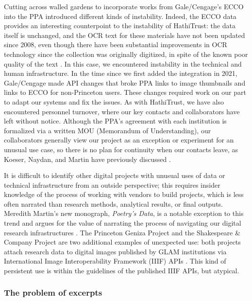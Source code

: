 \documentclass{anthology-ch}         %
\begin{document}
Cutting across walled gardens to incorporate works from Gale/Cengage’s ECCO into the PPA introduced different kinds of instability. Indeed, the ECCO data provides an interesting counterpoint to the instability of HathiTrust: the data itself is unchanged, and the OCR text for these materials have not been updated since 2008, even though there have been substantial improvements in OCR technology since the collection was originally digitized, in spite of the known poor quality of the text \cite{hill_quantifying_2019}. In this case, we encountered instability in the technical and human infrastructure. In the time since we first added the integration in 2021, Gale/Cengage made API changes that broke PPA links to image thumbnails and links to ECCO for non-Princeton users. These changes required work on our part to adapt our systems and fix the issues. As with HathiTrust, we have also encountered personnel turnover, where our key contacts and collaborators have left without notice. Although the PPA's agreement with each institution is formalized via a written MOU (Memorandum of Understanding), our collaborators generally view our project as an exception or experiment for an unusual use case, so there is no plan for continuity when our contacts leave, as Koeser, Naydan, and Martin have previously discussed \cite{naydan_beyond_2024}.

It is difficult to identify other digital projects with unusual uses of data or technical infrastructure from an outside perspective; this requires insider knowledge of the process of working with vendors to build projects, which is less often narrated than research methods, analytical results, or final outputs. Meredith Martin’s new monograph, \textit{Poetry’s Data}, is a notable exception to this trend and argues for the value of narrating the process of navigating our digital research infrastructures \cite{martin_poetrys_2025}. The Princeton Geniza Project and the Shakespeare \& Company Project are two additional examples of unexpected use: both projects attach research data to digital images published by GLAM institutions via International Image Interoperability Framework (IIIF) APIs \cite{noauthor_princeton_nodate, noauthor_shakespeare_2020}. This kind of persistent use is within the guidelines of the published IIIF APIs, but atypical.

\subsubsection{The problem of excerpts}
\end{document}
